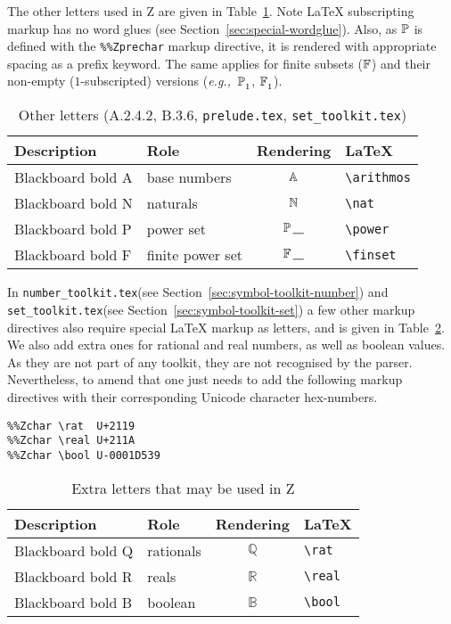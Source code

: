 \documentclass{article}
\newcommand{\emfile}[1]{\texttt{#1}}%
\newcommand{\preludefile}{\emfile{prelude.tex}}
\newcommand{\settkfile}{\emfile{set\_toolkit.tex}}
\newcommand{\numtkfile}{\emfile{number\_toolkit.tex}}
\newcommand{\smallcaption}[1]{{\small (#1)}}
\def \rat        {\mathbb Q}
\def \real       {\mathbb R}
\def \bool       {\mathbb B}
\begin{document}
The other letters used in Z are given in Table~\ref{tbl:letters-other}.
Note \LaTeX{} subscripting markup has no word glues (see Section~\ref{sec:special-wordglue}).
Also, as $\power$ is defined with the \verb|%%Zprechar| markup directive, it is rendered
with appropriate spacing as a prefix keyword. The same applies for finite subsets
($\finset$) and their non-empty ($1$-subscripted) versions (\textit{e.g.,}~$\power_1$, $\finset_1$).
%
\begin{table}[ht]
\centering
\begin{tabular}{|l|l|c|l|}
   \hline
   \textbf{Description} & \textbf{Role} & \textbf{Rendering} & \textbf{\LaTeX} \\
   \hline
   Blackboard bold A & base numbers      & $\arithmos$    & \verb|\arithmos| \\
   \hline
   Blackboard bold N & naturals          & $\nat$         & \verb|\nat| \\
   \hline
   Blackboard bold P & power set         & $\power\varg$  & \verb|\power| \\
   \hline
   Blackboard bold F & finite power set  & $\finset\varg$ & \verb|\finset| \\
   \hline
\end{tabular}
\caption{Other letters \smallcaption{A.2.4.2, B.3.6, \preludefile, \settkfile}}\label{tbl:letters-other}
\end{table}
%
In \numtkfile (see Section~\ref{sec:symbol-toolkit-number}) and
\settkfile (see Section~\ref{sec:symbol-toolkit-set}) a few other
markup directives also require special \LaTeX{} markup
as letters, and is given in Table~\ref{tbl:letters-other-extra}.
We also add extra ones for rational and real numbers, as well as boolean values.
As they are not part of any toolkit, they are not recognised by the parser.
Nevertheless, to amend that one just needs to add the following markup directives
with their corresponding Unicode character hex-numbers.
%
\begin{verbatim}
%%Zchar \rat  U+2119
%%Zchar \real U+211A
%%Zchar \bool U-0001D539
\end{verbatim}
%
\begin{table}[ht]
\centering
\begin{tabular}{|l|l|c|l|}
   \hline
   \textbf{Description} & \textbf{Role} & \textbf{Rendering} & \textbf{\LaTeX} \\
   \hline
   Blackboard bold Q & rationals   & $\rat$ & \verb|\rat| \\
   \hline
   Blackboard bold R & reals        & $\real$ & \verb|\real| \\
   \hline
   Blackboard bold B & boolean     & $\bool$      & \verb|\bool| \\
   \hline
\end{tabular}
\caption{Extra letters that may be used in Z}\label{tbl:letters-other-extra}
\end{table}
\end{document}
